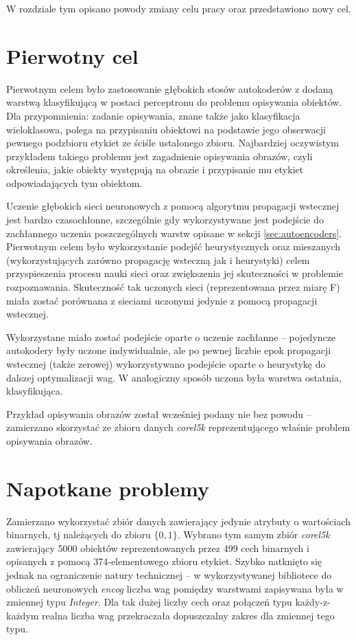 \documentclass[11pt,a4paper,oneside]{report}
\begin{document}
W rozdziale tym opisano powody zmiany celu pracy oraz przedstawiono nowy cel.

\section{Pierwotny cel}

Pierwotnym celem było zastosowanie głębokich stosów autokoderów z dodaną warstwą klasyfikującą w postaci perceptronu do problemu opisywania obiektów. Dla przypomnienia: zadanie opisywania, znane także jako klasyfikacja wieloklasowa, polega na przypisaniu obiektowi na podstawie jego obserwacji pewnego podzbioru etykiet ze ściśle ustalonego zbioru. Najbardziej oczywistym przykładem takiego problemu jest zagadnienie opisywania obrazów, czyli określenia, jakie obiekty występują na obrazie i przypisanie mu etykiet odpowiadających tym obiektom. 

Uczenie głębokich sieci neuronowych z pomocą algorytmu propagacji wstecznej jest bardzo czasochłonne, szczególnie gdy wykorzystywane jest podejście do zachłannego uczenia poszczególnych warstw opisane w sekcji \ref{sec:autoencoders}. Pierwotnym celem było wykorzystanie podejść heurystycznych oraz mieszanych (wykorzystujących zarówno propagację wsteczną jak i heurystyki) celem przyspieszenia procesu nauki sieci oraz zwiększenia jej skuteczności w problemie rozpoznawania. Skuteczność tak uczonych sieci (reprezentowana przez miarę F) miała zostać porównana z sieciami uczonymi jedynie z pomocą propagacji wstecznej.

Wykorzystane miało zostać podejście oparte o uczenie zachłanne -- pojedyncze autokodery były uczone indywidualnie, ale po pewnej liczbie epok propagacji wstecznej (także zerowej) wykorzystywano podejście oparte o heurystykę do dalszej optymalizacji wag. W analogiczny sposób uczona była warstwa ostatnia, klasyfikująca.

Przykład opisywania obrazów został wcześniej podany nie bez powodu -- zamierzano skorzystać ze zbioru danych \textit{corel5k} \cite{alcala2010keel} reprezentującego właśnie problem opisywania obrazów.

\section{Napotkane problemy}

Zamierzano wykorzystać zbiór danych zawierający jedynie atrybuty o wartościach binarnych, tj należących do zbioru $\lbrace 0, 1 \rbrace$. Wybrano tym samym zbiór \textit{corel5k} zawierający 5000 obiektów reprezentowanych przez 499 cech binarnych i opisanych z pomocą 374-elementowego zbioru etykiet. Szybko natknięto się jednak na ograniczenie natury technicznej -- w wykorzystywanej bibliotece do obliczeń neuronowych \textit{encog} liczba wag pomiędzy warstwami zapisywana była w zmiennej typu \textit{Integer}. Dla tak dużej liczby cech oraz połączeń typu każdy-z-każdym realna liczba wag przekraczała dopuszczalny zakres dla zmiennej tego typu.
\end{document}
